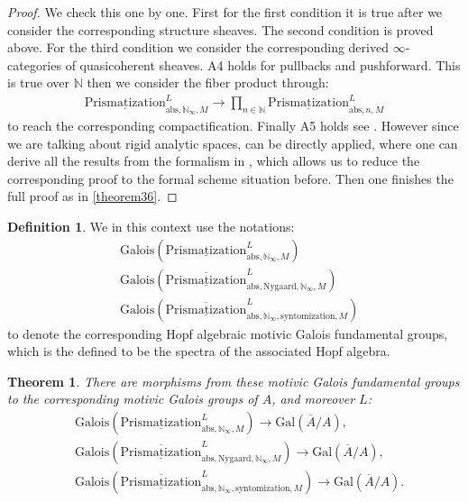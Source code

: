 \documentclass[12pt]{article}
\newtheorem{theorem}{Theorem}
\theoremstyle{definition}
\newtheorem{definition}{Definition}
\begin{document}
\begin{proof}
We check this one by one. First for the first condition it is true after we consider the corresponding structure sheaves. The second condition is proved above. For the third condition we consider the corresponding derived $\infty$-categories of quasicoherent sheaves. A4 holds for pullbacks and pushforward. This is true over $\mathbb{N}$ then we consider the fiber product through:
\begin{align}
{\underline{\mathrm{Prismatization}}}^L_{\mathrm{abs},\mathbb{N}_\infty,M}\rightarrow  \prod_{n\in \mathbb{N}} {\underline{\mathrm{Prismatization}}}^L_{\mathrm{abs},n,M}
\end{align}
to reach the corresponding compactification. Finally A5 holds see \cite[Chapter 4, in particular 4.7, 4.8, 4.9, 4.10]{3A}. However since we are talking about rigid analytic spaces, \cite{3A} can be directly applied, where one can derive all the results from the formalism in \cite{3A}, which allows us to reduce the corresponding proof to the formal scheme situation before. Then one finishes the full proof as in \cref{theorem36}.
\end{proof}


\begin{definition}
We in this context use the notations:
\begin{align}
&\mathrm{Galois}(\underline{\mathrm{Prismatization}}^L_{\mathrm{abs},\mathbb{N}_\infty,M})\\
&\mathrm{Galois}(\overline{\underline{\mathrm{Prismatization}}}^L_{\mathrm{abs},\mathrm{Nygaard},\mathbb{N}_\infty,M})\\
&\mathrm{Galois}(\overline{\underline{\mathrm{Prismatization}}}^L_{\mathrm{abs},\mathbb{N}_\infty,\mathrm{syntomization},M})
\end{align}
to denote the corresponding Hopf algebraic motivic Galois fundamental groups, which is the defined to be the spectra of the associated Hopf algebra.
\end{definition}


\begin{theorem}
There are morphisms from these motivic Galois fundamental groups to the corresponding motivic Galois groups of $A$, and moreover $L$: 
\begin{align}
&\mathrm{Galois}(\underline{\mathrm{Prismatization}}^L_{\mathrm{abs},\mathbb{N}_\infty,M})\rightarrow \mathrm{Gal}(\overline{A}/A),\\
&\mathrm{Galois}(\overline{\underline{\mathrm{Prismatization}}}^L_{\mathrm{abs},\mathrm{Nygaard},\mathbb{N}_\infty,M})\rightarrow \mathrm{Gal}(\overline{A}/A),\\
&\mathrm{Galois}(\overline{\underline{\mathrm{Prismatization}}}^L_{\mathrm{abs},\mathbb{N}_\infty,\mathrm{syntomization},M})\rightarrow \mathrm{Gal}(\overline{A}/A).
\end{align}
\end{theorem}
\end{document}
